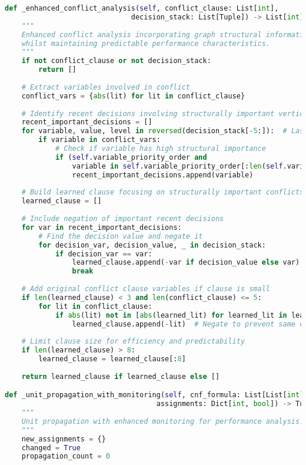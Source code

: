 \begin{lstlisting}[language=Python, caption=Streamlined Conflict Analysis with Graph Structure Integration]
def _enhanced_conflict_analysis(self, conflict_clause: List[int], 
                              decision_stack: List[Tuple]) -> List[int]:
    """
    Enhanced conflict analysis incorporating graph structural information
    whilst maintaining predictable performance characteristics.
    """
    if not conflict_clause or not decision_stack:
        return []
    
    # Extract variables involved in conflict
    conflict_vars = {abs(lit) for lit in conflict_clause}
    
    # Identify recent decisions involving structurally important vertices
    recent_important_decisions = []
    for variable, value, level in reversed(decision_stack[-5:]):  # Last 5 decisions
        if variable in conflict_vars:
            # Check if variable has high structural importance
            if (self.variable_priority_order and 
                variable in self.variable_priority_order[:len(self.variable_priority_order)//3]):
                recent_important_decisions.append(variable)
    
    # Build learned clause focusing on structurally important conflicts
    learned_clause = []
    
    # Include negation of important recent decisions
    for var in recent_important_decisions:
        # Find the decision value and negate it
        for decision_var, decision_value, _ in decision_stack:
            if decision_var == var:
                learned_clause.append(-var if decision_value else var)
                break
    
    # Add original conflict clause variables if clause is small
    if len(learned_clause) < 3 and len(conflict_clause) <= 5:
        for lit in conflict_clause:
            if abs(lit) not in [abs(learned_lit) for learned_lit in learned_clause]:
                learned_clause.append(-lit)  # Negate to prevent same conflict
    
    # Limit clause size for efficiency and predictability
    if len(learned_clause) > 8:
        learned_clause = learned_clause[:8]
    
    return learned_clause if learned_clause else []

def _unit_propagation_with_monitoring(self, cnf_formula: List[List[int]], 
                                    assignments: Dict[int, bool]) -> Tuple[List[List[int]], Dict[int, bool]]:
    """
    Unit propagation with enhanced monitoring for performance analysis.
    """
    new_assignments = {}
    changed = True
    propagation_count = 0
    

\end{lstlisting}
